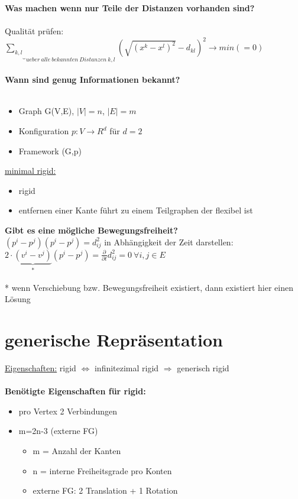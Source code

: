 \documentclass[12pt,a4paper]{article}
\begin{document}
\textbf{Was machen wenn nur Teile der Distanzen vorhanden sind?}\\\\
Qualität prüfen: $\underbrace{\sum \limits_{k,l}}_{ueber\ alle\ bekannten\ Distanzen\ k,l}(\sqrt{(x^k-x^l)^2}-d_{kl})^2 \rightarrow min (=0)$
\\\\
\textbf{Wann sind genug Informationen bekannt?}\\\\
\begin{itemize}
	\item Graph G(V,E), $|V|=n$, $|E|=m$
	\item Konfiguration $p:V\rightarrow R^d$ für $d=2$
	\item Framework (G,p)
\end{itemize}

\newpage
\underline{minimal rigid:}
\begin{itemize}
	\item rigid
	\item entfernen einer Kante führt zu einem Teilgraphen der flexibel ist
\end{itemize}

\textbf{Gibt es eine mögliche Bewegungsfreiheit?}\\
$(p^i-p^j)(p^i-p^j)=d_{ij}^2$ in Abhängigkeit der Zeit darstellen:\\
$2\cdot \underbrace{(v^i-v^j)}_{*}(p^i-p^j)=\frac{\partial}{\partial t}d_{ij}^2=0\ \forall i,j \in E$\\\\
* wenn Verschiebung bzw. Bewegungsfreiheit existiert, dann existiert hier einen Lösung


\section{generische Repräsentation}
\underline{Eigenschaften:} rigid $\Leftrightarrow$ infinitezimal rigid $\Rightarrow$ generisch rigid
\\\\
\textbf{Benötigte Eigenschaften für rigid:}
\begin{itemize}
	\item pro Vertex 2 Verbindungen
	\item m=2n-3 (externe FG)
	\begin{itemize}
		\item m = Anzahl der Kanten
		\item n = interne Freiheitsgrade pro Konten
		\item externe FG: 2 Translation + 1 Rotation
	\end{itemize}
\end{itemize}
\end{document}
